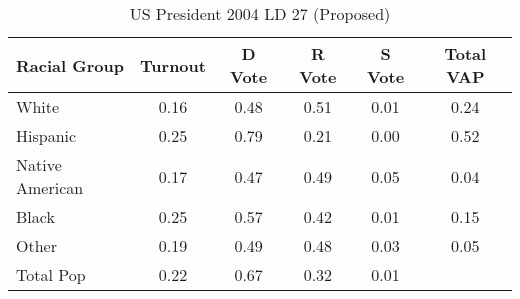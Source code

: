 \begin{table}[htb]
\begin{center}
\caption{US President 2004 LD 27 (Proposed)}
\label{pres04_vap_ld_27}
\begin{tabular}{lccccc}
  \hline
Racial Group & Turnout & D Vote & R Vote & S Vote & Total VAP \\ 
  \hline
White & 0.16 & 0.48 & 0.51 & 0.01 & 0.24 \\ 
  Hispanic & 0.25 & 0.79 & 0.21 & 0.00 & 0.52 \\ 
  Native American & 0.17 & 0.47 & 0.49 & 0.05 & 0.04 \\ 
  Black & 0.25 & 0.57 & 0.42 & 0.01 & 0.15 \\ 
  Other & 0.19 & 0.49 & 0.48 & 0.03 & 0.05 \\ 
  Total Pop & 0.22 & 0.67 & 0.32 & 0.01 &  \\ 
   \hline
\end{tabular}
\end{center}
\end{table}
